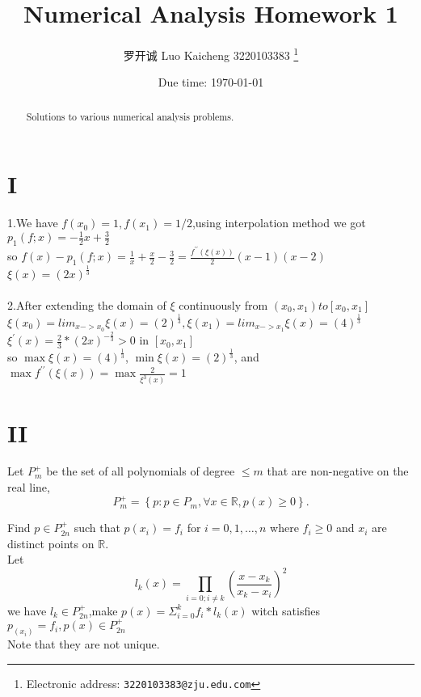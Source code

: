 \documentclass[a4paper]{article}
\begin{document}
\title{Numerical Analysis Homework 1}

\author{罗开诚 Luo Kaicheng 3220103383
  \thanks{Electronic address: \texttt{3220103383@zju.edu.com}}}

\date{Due time: \today}

\maketitle

\begin{abstract}
    Solutions to various numerical analysis problems.
\end{abstract}

\section*{I}
1.We have $f(x_0)=1,f(x_1)=1/2$,using interpolation method we got $p_1(f;x)=-\frac{1}{2}x+\frac{3}{2}$\\
so $f(x)-p_1(f;x)=\frac{1}{x}+\frac{x}{2}-\frac{3}{2} = \frac{f^{\prime\prime}(\xi(x))}{2}(x - 1)(x - 2)$\\
$\xi(x)=(2x)^{\frac{1}{3}}$\\
\\
2.After extending the domain of $\xi$ continuously from $(x_0, x_1) to [x_0, x_1]$\\
$\xi(x_0)=lim_{x->x_0}\xi(x)=(2)^{\frac{1}{3}},\xi(x_1)=lim_{x->x_1}\xi(x)=(4)^{\frac{1}{3}}$\\
$\xi^{'}(x)=\frac{2}{3}*(2x)^{-\frac{2}{3}}>0$ in $[x_0, x_1]$\\
so \( \max \xi(x) =(4)^{\frac{1}{3}}\), \( \min \xi(x)=(2)^{\frac{1}{3}} \), and \( \max f^{\prime\prime}(\xi(x)) =\max \frac{2}{\xi^3(x)}=1\)

\section*{II}
Let \( P_{m}^{+} \) be the set of all polynomials of degree \( \leq m \) that are non-negative on the real line,
\[
P_{m}^{+} = \left\{ p : p \in P_{m}, \forall x \in \mathbb{R}, p(x) \geq 0 \right\}.
\]

Find \( p \in P_{2n}^{+} \) such that \( p(x_{i}) = f_{i} \) for \( i = 0, 1, \ldots, n \) where \( f_{i} \geq 0 \) and \( x_{i} \) are distinct points on \( \mathbb{R} \).\\
Let
\[
l_k(x)=\prod_{i=0;i\neq k}(\frac{x-x_k}{x_k-x_i})^2
\]
we have $l_k \in P_{2n}^{+}$,make $p(x)=\Sigma_{i=0}^{k}f_i*l_k(x)$ witch satisfies $p_(x_i)=f_i, p(x)\in P_{2n}^{+}$ \\
Note that they are not unique.\\
\end{document}
